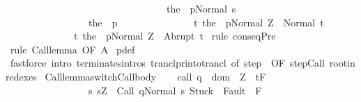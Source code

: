 \begin{isabellebody}
\ \ \ \ \ \ \ \ \ \ \ \ \ \ \ \ \ \ \ \ \ \ \ \ \ \ \ \ \ \ \ \ \ {\isasymGamma}{\isasymturnstile}the\ {\isacharparenleft}{\isasymGamma}\ p{\isacharparenright}{\isasymdown}Normal\ s{\isacharbraceright}{\isacharparenright}\ \isanewline
\ \ \ \ \ \ \ \ \ \ \ \ \ \ \ \ \ the\ {\isacharparenleft}{\isasymGamma}\ p{\isacharparenright}\ \isanewline
\ \ \ \ \ \ \ \ \ \ \ \ \ \ {\isacharbraceleft}t{\isachardot}\ {\isasymGamma}{\isasymturnstile}{\isasymlangle}the\ {\isacharparenleft}{\isasymGamma}\ p{\isacharparenright}{\isacharcomma}Normal\ Z{\isasymrangle}\ {\isasymRightarrow}\ Normal\ t{\isacharbraceright}{\isacharcomma}\isanewline
\ \ \ \ \ \ \ \ \ \ \ \ \ \ {\isacharbraceleft}t{\isachardot}\ {\isasymGamma}{\isasymturnstile}{\isasymlangle}the\ {\isacharparenleft}{\isasymGamma}\ p{\isacharparenright}{\isacharcomma}Normal\ Z{\isasymrangle}\ {\isasymRightarrow}\ Abrupt\ t{\isacharbraceright}{\isachardoublequoteclose}\isanewline
%
\isadelimproof
%
\endisadelimproof
%
\isatagproof
{}\isamarkupfalse%
\ {\isacharparenleft}rule\ conseqPre{\isacharparenright}\isanewline
{}\isamarkupfalse%
\ {\isacharparenleft}rule\ Call{\isacharunderscore}lemma{\isacharprime}\ {\isacharbrackleft}OF\ A{\isacharbrackright}{\isacharparenright}\isanewline
{}\isamarkupfalse%
\ pdef\isanewline
{}\isamarkupfalse%
\ {\isacharparenleft}fastforce\ intro{\isacharcolon}\ terminates{\isachardot}intros\ tranclp{\isachardot}r{\isacharunderscore}into{\isacharunderscore}trancl\ {\isacharbrackleft}of\ {\isachardoublequoteopen}{\isacharparenleft}step\ {\isasymGamma}{\isacharparenright}{\isachardoublequoteclose}{\isacharcomma}\ OF\ step{\isachardot}Call{\isacharbrackright}\ root{\isacharunderscore}in{\isacharunderscore}redexes{\isacharparenright}\isanewline
{}\isamarkupfalse%
%
\endisatagproof
{\isafoldproof}%
%
\isadelimproof
\isanewline
%
\endisadelimproof
\isanewline
{}\isamarkupfalse%
\ Call{\isacharunderscore}lemma{\isacharunderscore}switch{\isacharunderscore}Call{\isacharunderscore}body{\isacharcolon}\isanewline
\ \ \isanewline
\ call{\isacharcolon}\ {\isachardoublequoteopen}{\isasymforall}q\ {\isasymin}\ dom\ {\isasymGamma}{\isachardot}\ {\isasymforall}Z{\isachardot}\ {\isasymGamma}{\isacharcomma}{\isasymTheta}\ {\isasymturnstile}\isactrlsub t\isactrlbsub {\isacharslash}F\isactrlesub \ \isanewline
\ \ \ \ \ \ \ \ \ \ \ \ \ \ \ \ \ {\isacharbraceleft}s{\isachardot}\ s{\isacharequal}Z\ {\isasymand}\ {\isasymGamma}{\isasymturnstile}{\isasymlangle}Call\ q{\isacharcomma}Normal\ s{\isasymrangle}\ {\isasymRightarrow}{\isasymnotin}{\isacharparenleft}{\isacharbraceleft}Stuck{\isacharbraceright}\ {\isasymunion}\ Fault\ {\isacharbackquote}\ {\isacharparenleft}{\isacharminus}F{\isacharparenright}{\isacharparenright}\ {\isasymand}\ \isanewline

\end{isabellebody}
